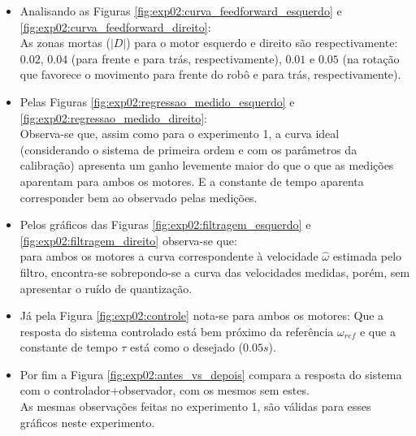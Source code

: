 \begin{itemize}
    \item Analisando as Figuras \ref{fig:exp02:curva_feedforward_esquerdo} e \ref{fig:exp02:curva_feedforward_direito}:\\
        As zonas mortas ($|D|$) para o motor esquerdo e direito são respectivamente: $0.02$, $0.04$ (para frente e para trás, respectivamente), $0.01$ e $0.05$ (na rotação que favorece o movimento para frente do robô e para trás, respectivamente).
    \item Pelas Figuras \ref{fig:exp02:regressao_medido_esquerdo} e \ref{fig:exp02:regressao_medido_direito}:\\
        Observa-se que, assim como para o experimento 1, a curva ideal (considerando o sistema de primeira ordem e com os parâmetros da calibração) apresenta um ganho levemente maior do que o que as medições aparentam para ambos os motores. E a constante de tempo aparenta corresponder bem ao observado pelas medições.
    \item Pelos gráficos das Figuras \ref{fig:exp02:filtragem_esquerdo} e \ref{fig:exp02:filtragem_direito} observa-se que:\\
        para ambos os motores a curva correspondente à velocidade $\hat{\omega}$ estimada pelo filtro, encontra-se sobrepondo-se a curva das velocidades medidas, porém, sem apresentar o ruído de quantização.
    \item Já pela Figura \ref{fig:exp02:controle} nota-se para ambos os motores:
        Que a resposta do sistema controlado está bem próximo da referência $\omega_{ref}$ e que a constante de tempo $\tau$ está como o desejado ($0.05s$).
    \item Por fim a Figura \ref{fig:exp02:antes_vs_depois} compara a resposta do sistema com o controlador+observador, com os mesmos sem estes. \\
        As mesmas observações feitas no experimento 1, são válidas para esses gráficos neste experimento.
\end{itemize}

